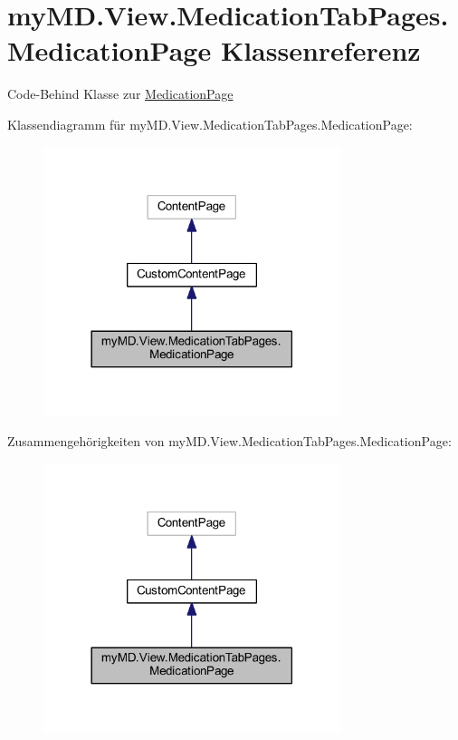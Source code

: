 \hypertarget{classmy_m_d_1_1_view_1_1_medication_tab_pages_1_1_medication_page}{}\section{my\+M\+D.\+View.\+Medication\+Tab\+Pages.\+Medication\+Page Klassenreferenz}
\label{classmy_m_d_1_1_view_1_1_medication_tab_pages_1_1_medication_page}


Code-\/\+Behind Klasse zur \mbox{\hyperlink{classmy_m_d_1_1_view_1_1_medication_tab_pages_1_1_medication_page}{Medication\+Page}}  




Klassendiagramm für my\+M\+D.\+View.\+Medication\+Tab\+Pages.\+Medication\+Page\+:
\nopagebreak
\begin{figure}[H]
\begin{center}
\leavevmode
\includegraphics[width=246pt]{classmy_m_d_1_1_view_1_1_medication_tab_pages_1_1_medication_page__inherit__graph}
\end{center}
\end{figure}


Zusammengehörigkeiten von my\+M\+D.\+View.\+Medication\+Tab\+Pages.\+Medication\+Page\+:
\nopagebreak
\begin{figure}[H]
\begin{center}
\leavevmode
\includegraphics[width=246pt]{classmy_m_d_1_1_view_1_1_medication_tab_pages_1_1_medication_page__coll__graph}
\end{center}
\end{figure}
